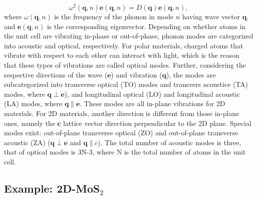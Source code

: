 \begin{equation}\label{eqa:w_q}
\omega^2(\mathbf{q},n)\mathbf{e}(\mathbf{q},n)=D(\mathbf{q})\mathbf{e}(\mathbf{q},n),
\end{equation}
where $\omega(\mathbf{q},n)$ is the frequency of the phonon in mode $n$ having wave vector $\mathbf{q}$, and $\mathbf{e}(\mathbf{q},n)$ is the corresponding eigenvector\cite{Ackland1997,Parlinski2011}.  Depending on whether atoms in the unit cell are vibrating in-phase or out-of-phase, phonon modes are categorized into acoustic and optical, respectively. For polar materials, charged atoms that vibrate with respect to each other can interact with light, which is the reason that these types of vibrations are called optical modes. Further, considering the respective directions of the wave ($\mathbf{e}$) and vibration ($\mathbf{q}$), the modes are subcategorized into transverse optical (TO) modes and transvers acoustice (TA) modes, where $\mathbf{q} \perp \mathbf{e}$), and longitudinal optical (LO) and longitudinal acoustic (LA) modes, where $\mathbf{q} \parallel \mathbf{e}$. These modes are all in-plane vibrations for 2D materials. For 2D materials, another direction is different from those in-plane ones, namely the $\mathbf{c}$ lattice vector direction perpendicular to the 2D plane. Special modes exist: out-of-plane transverse optical (ZO) and out-of-plane transverse acoustic (ZA) ($\mathbf{q} \perp \mathbf{e}$ and $\mathbf{q} \parallel c$). The total number of acoustic modes is three, that of optical modes is 3N-3, where N is the total number of atoms in the unit cell. 


\subsection{Example: 2D-MoS$_2$}


